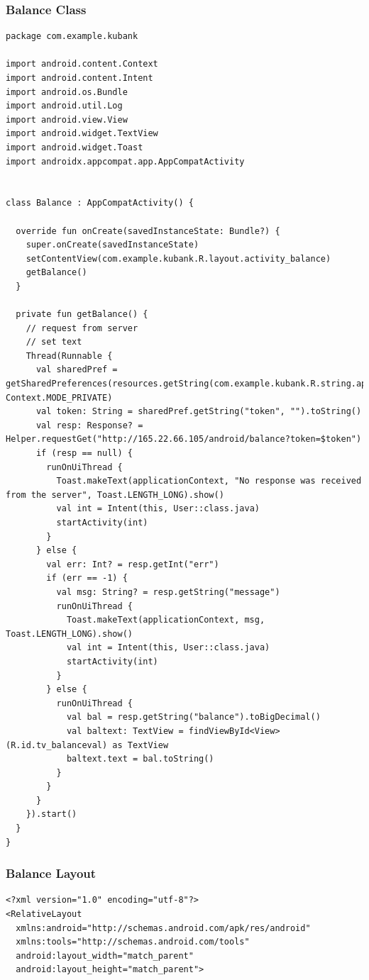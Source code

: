 \documentclass[11pt, a4paper]{article}
\begin{document}
\begin{appendices}
\subsubsection{Balance Class}
\begin{lstlisting}
package com.example.kubank

import android.content.Context
import android.content.Intent
import android.os.Bundle
import android.util.Log
import android.view.View
import android.widget.TextView
import android.widget.Toast
import androidx.appcompat.app.AppCompatActivity


class Balance : AppCompatActivity() {

  override fun onCreate(savedInstanceState: Bundle?) {
    super.onCreate(savedInstanceState)
    setContentView(com.example.kubank.R.layout.activity_balance)
    getBalance()
  }

  private fun getBalance() {
    // request from server
    // set text
    Thread(Runnable {
      val sharedPref = getSharedPreferences(resources.getString(com.example.kubank.R.string.app_name), Context.MODE_PRIVATE)
      val token: String = sharedPref.getString("token", "").toString()
      val resp: Response? = Helper.requestGet("http://165.22.66.105/android/balance?token=$token")
      if (resp == null) {
        runOnUiThread {
          Toast.makeText(applicationContext, "No response was received from the server", Toast.LENGTH_LONG).show()
          val int = Intent(this, User::class.java)
          startActivity(int)
        }
      } else {
        val err: Int? = resp.getInt("err")
        if (err == -1) {
          val msg: String? = resp.getString("message")
          runOnUiThread {
            Toast.makeText(applicationContext, msg, Toast.LENGTH_LONG).show()
            val int = Intent(this, User::class.java)
            startActivity(int)
          }
        } else {
          runOnUiThread {
            val bal = resp.getString("balance").toBigDecimal()
            val baltext: TextView = findViewById<View>(R.id.tv_balanceval) as TextView
            baltext.text = bal.toString()
          }
        }
      }
    }).start()
  }
}

\end{lstlisting}
\subsubsection{Balance Layout}
\begin{lstlisting}
<?xml version="1.0" encoding="utf-8"?>
<RelativeLayout
  xmlns:android="http://schemas.android.com/apk/res/android"
  xmlns:tools="http://schemas.android.com/tools"
  android:layout_width="match_parent"
  android:layout_height="match_parent">



\end{lstlisting}
\end{appendices}
\end{document}
